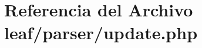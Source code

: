 \hypertarget{leaf_2parser_2update_8php}{\section{Referencia del Archivo leaf/parser/update.php}
\label{leaf_2parser_2update_8php}
}
